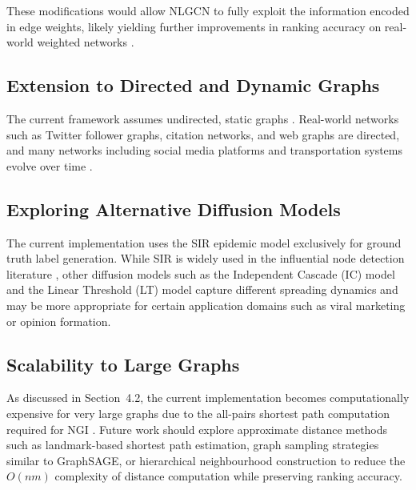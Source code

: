 These modifications would allow NLGCN to fully exploit the
information encoded in edge weights, likely yielding further
improvements in ranking accuracy on real-world weighted networks
\cite{guo2026, zhang2019gcn}.

\subsection{Extension to Directed and Dynamic Graphs}

The current framework assumes undirected, static graphs
\cite{guo2026}. Real-world networks such as Twitter follower
graphs, citation networks, and web graphs are directed, and many
networks including social media platforms and transportation
systems evolve over time \cite{hafiene2020}.



\subsection{Exploring Alternative Diffusion Models}

The current implementation uses the SIR epidemic model exclusively for ground truth label generation.
While SIR is widely used in the influential node detection
literature \cite{guo2026, chen2012}, other diffusion
models such as the Independent Cascade (IC) model and the
Linear Threshold (LT) model \cite{hafiene2020} capture
different spreading dynamics and may be more appropriate for
certain application domains such as viral marketing or opinion
formation.

\subsection{Scalability to Large Graphs}

As discussed in Section~4.2, the current implementation becomes
computationally expensive for very large graphs due to the
all-pairs shortest path computation required for NGI
\cite{guo2026, farooq2018}. Future work should explore
approximate distance methods such as landmark-based shortest
path estimation, graph sampling strategies similar to
GraphSAGE, or hierarchical neighbourhood
construction to reduce the $O(nm)$ complexity of distance
computation while preserving ranking accuracy.

